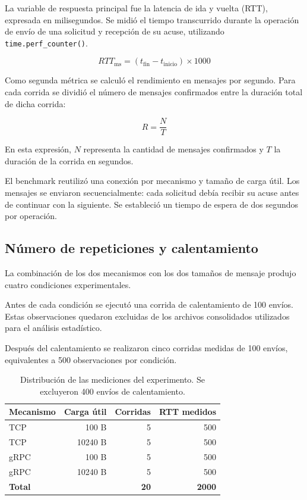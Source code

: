 La variable de respuesta principal fue la latencia de ida y vuelta (RTT), expresada
en milisegundos. Se midió el tiempo transcurrido durante la operación de
envío de una solicitud y recepción de su acuse, utilizando
\texttt{time.perf\_counter()}.

\begin{equation}
RTT_{\mathrm{ms}} =
(t_{\mathrm{fin}}-t_{\mathrm{inicio}})
\times 1000
\end{equation}

Como segunda métrica se calculó el rendimiento en mensajes por segundo. Para
cada corrida se dividió el número de mensajes confirmados entre la duración
total de dicha corrida:

\begin{equation}
R = \frac{N}{T}
\end{equation}

En esta expresión, $N$ representa la cantidad de mensajes confirmados y $T$
la duración de la corrida en segundos.

El benchmark reutilizó una conexión por mecanismo y tamaño de carga útil. Los
mensajes se enviaron secuencialmente: cada solicitud debía recibir su acuse
antes de continuar con la siguiente. Se estableció un tiempo de espera de
dos segundos por operación.

\subsection{Número de repeticiones y calentamiento}

La combinación de los dos mecanismos con los dos tamaños de mensaje produjo
cuatro condiciones experimentales.

Antes de cada condición se ejecutó una corrida de calentamiento de 100 envíos.
Estas observaciones quedaron excluidas de los archivos consolidados utilizados
para el análisis estadístico.

Después del calentamiento se realizaron cinco corridas medidas de 100 envíos,
equivalentes a 500 observaciones por condición.

\begin{table}[htbp]
\centering
\small
\begin{tabular}{lrrr}
\toprule
Mecanismo & Carga útil & Corridas & RTT medidos \\
\midrule
TCP  & 100 B   & 5 & 500 \\
TCP  & 10240 B & 5 & 500 \\
gRPC & 100 B   & 5 & 500 \\
gRPC & 10240 B & 5 & 500 \\
\midrule
\textbf{Total} & & \textbf{20} & \textbf{2000} \\
\bottomrule
\end{tabular}
\caption{Distribución de las mediciones del
experimento. Se excluyeron 400 envíos de
calentamiento.}
\label{tab:diseno_experimental}
\end{table}

